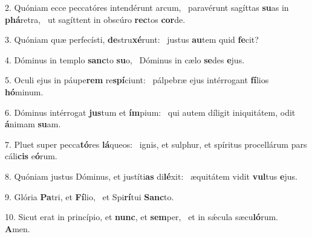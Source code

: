 2. Quóniam ecce peccatóres intendérunt arcum, \dag\  paravérunt sagíttas \textbf{su}as in \textbf{phá}retra, \ast\  ut sagíttent in obscúro \textbf{rec}tos \textbf{cor}de.\

3. Quóniam quæ perfecísti, \textbf{de}stru\textbf{xé}runt: \ast\  justus \textbf{au}tem quid \textbf{fe}cit?\

4. Dóminus in templo \textbf{sanc}to \textbf{su}o, \ast\  Dóminus in cælo \textbf{se}des \textbf{e}jus.\

5. Oculi ejus in páupe\textbf{rem} re\textbf{spí}ciunt: \ast\  pálpebræ ejus intérrogant \textbf{fí}lios \textbf{hó}minum.\

6. Dóminus intérrogat \textbf{jus}tum et \textbf{ím}pium: \ast\  qui autem díligit iniquitátem, odit \textbf{á}nimam \textbf{su}am.\

7. Pluet super pecca\textbf{tó}res \textbf{lá}queos: \ast\  ignis, et sulphur, et spíritus procellárum pars cáli\textbf{cis} e\textbf{ó}rum.\

8. Quóniam justus Dóminus, et justíti\textbf{as} di\textbf{lé}xit: \ast\  æquitátem vidit \textbf{vul}tus \textbf{e}jus.\

9. Glória \textbf{Pa}tri, et \textbf{Fí}lio, \ast\  et Spi\textbf{rí}tui \textbf{Sanc}to.\

10. Sicut erat in princípio, et \textbf{nunc}, et \textbf{sem}per, \ast\  et in sǽcula sæcu\textbf{ló}rum. \textbf{A}men.\

